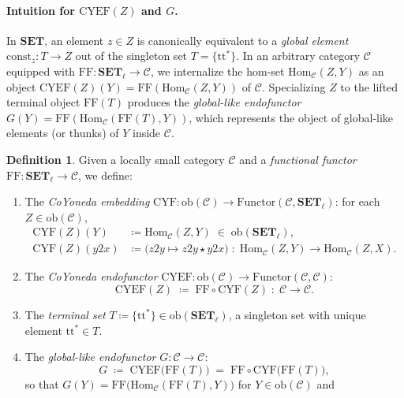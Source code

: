 \documentclass[11pt,a4paper]{article}
\theoremstyle{definition}
\newtheorem{definition}[theorem]{Definition}
\theoremstyle{remark}
\newcommand{\Set}{\mathbf{SET}}
\newcommand{\Hom}{\mathrm{Hom}}
\newcommand{\CYF}{\mathrm{CYF}}
\newcommand{\CYEF}{\mathrm{CYEF}}
\newcommand{\FF}{\mathrm{FF}}
\newcommand{\ttstar}{\mathrm{tt}^*}
\newcommand{\const}{\mathrm{const}}
\begin{document}
\paragraph{Intuition for $\CYEF(Z)$ and $G$.}
In $\Set$, an element $z \in Z$ is canonically equivalent to a \emph{global element} $\const_z : T \to Z$
out of the singleton set $T = \{\ttstar\}$. In an arbitrary category $\mathcal{C}$ equipped with
$\FF : \Set_\ell \to \mathcal{C}$, we internalize the hom-set $\Hom_{\mathcal{C}}(Z, Y)$ as an object
$\CYEF(Z)(Y) = \FF(\Hom_{\mathcal{C}}(Z, Y))$ of $\mathcal{C}$. Specializing $Z$ to the lifted terminal
object $\FF(T)$ produces the \emph{global-like endofunctor}
$G(Y) = \FF(\Hom_{\mathcal{C}}(\FF(T), Y))$, which represents the object of global-like elements (or
thunks) of $Y$ inside $\mathcal{C}$.

\begin{definition}\label{def:cyef}
Given a locally small category $\mathcal{C}$ and a \emph{functional functor}
$\FF : \Set_\ell \to \mathcal{C}$, we define:
\begin{enumerate}[label=(\roman*),nosep]
  \item The \emph{CoYoneda embedding} $\CYF : \mathrm{ob}(\mathcal{C}) \to \mathrm{Functor}(\mathcal{C}, \Set_\ell)$:
  for each $Z \in \mathrm{ob}(\mathcal{C})$,
  \begin{align*}
    \CYF(Z)(Y) &\coloneqq \Hom_{\mathcal{C}}(Z, Y) \;\in\; \mathrm{ob}(\Set_\ell), \\
    \CYF(Z)(y2x) &\coloneqq \bigl(z2y \mapsto z2y \star y2x\bigr)
      \;:\; \Hom_{\mathcal{C}}(Z, Y) \to \Hom_{\mathcal{C}}(Z, X).
  \end{align*}
\vspace{4 pt}
  \item The \emph{CoYoneda endofunctor} $\CYEF : \mathrm{ob}(\mathcal{C}) \to \mathrm{Functor}(\mathcal{C}, \mathcal{C})$:
  \[
    \CYEF(Z) \;\coloneqq\; \FF \circ \CYF(Z) \;:\; \mathcal{C} \longrightarrow \mathcal{C}.
  \]
\vspace{4 pt}
  \item The \emph{terminal set} $T \coloneqq \{ \ttstar \} \in \mathrm{ob}(\Set_\ell)$, a singleton set
  with unique element $\ttstar \in T$.
\vspace{4 pt}
  \item The \emph{global-like endofunctor} $G : \mathcal{C} \to \mathcal{C}$:
  \[
    G \;\coloneqq\; \CYEF\bigl(\FF(T)\bigr) \;=\; \FF \circ \CYF\bigl(\FF(T)\bigr),
  \]
  so that $G(Y) = \FF\bigl(\Hom_{\mathcal{C}}(\FF(T), Y)\bigr)$ for $Y \in \mathrm{ob}(\mathcal{C})$ and

\end{enumerate}
\end{definition}
\end{document}
